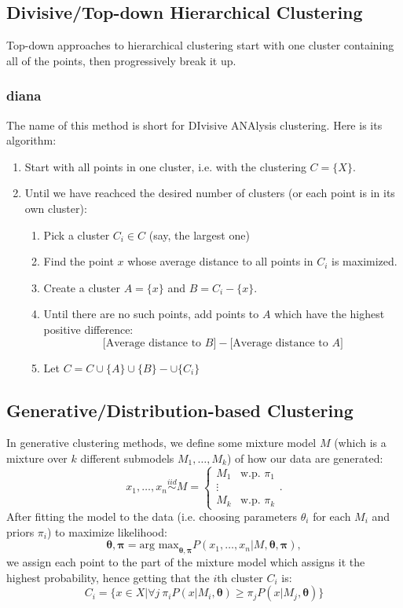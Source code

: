 \documentclass[12pt,a4paper]{article}
\newcommand{\1}[1]{\mathds{1}\left[#1\right]}
\newcommand{\argmax}{\text{arg max}}
\begin{document}
\subsection{Divisive/Top-down Hierarchical Clustering}

Top-down approaches to hierarchical clustering start with one cluster containing all of the points, then progressively break it up. 
\subsubsection{diana}
The name of this method is short for DIvisive ANAlysis clustering. Here is its algorithm:
\begin{enumerate}
    \item Start with all points in one cluster, i.e. with the clustering $C=\{X\}$.
    \item Until we have reachced the desired number of clusters (or each point is in its own cluster):\begin{enumerate}
        \item Pick a cluster $C_i\in C$ (say, the largest one)
        \item Find the point $x$ whose average distance to all points in $C_i$ is maximized.
        \item Create a cluster $A=\{x\}$ and $B=C_i-\{x\}$.
        \item Until there are no such points, add points to $A$ which have the highest positive difference:
            \[\text{[Average distance to $B$]}-\text{[Average distance to $A$]}\]
        \item Let $C=C\cup \{A\}\cup \{B\}-\cup \{C_i\}$
        \end{enumerate}
\end{enumerate}

\subsection{Generative/Distribution-based Clustering}
\newcommand{\btheta}{\boldsymbol\theta}
\newcommand{\bpi}{\boldsymbol\pi}
In generative clustering methods, we define some mixture model $M$ (which is a mixture over $k$ different submodels $M_1,\ldots,M_k$) of how our data are generated:
\[x_1,\ldots,x_n\stackrel{iid}{\sim} M = \begin{cases}M_1 & \text{w.p. }\pi_1\\\vdots\\M_k & \text{w.p. } \pi_k\end{cases}.\]
After fitting the model to the data (i.e. choosing parameters $\theta_i$ for each $M_i$ and priors $\pi_i$) to maximize likelihood:
\[\boldsymbol\theta,\boldsymbol\pi = \argmax_{\btheta,\bpi} P(x_1,\ldots,x_n|M,\btheta,\bpi),\]
we assign each point to the part of the mixture model which assigns it the highest probability, hence getting that the $i$th cluster $C_i$ is:
\[C_i=\{x\in X|\forall j\ \pi_iP(x|M_i,\btheta)\geq \pi_jP(x|M_j,\btheta)\}\]
\end{document}
